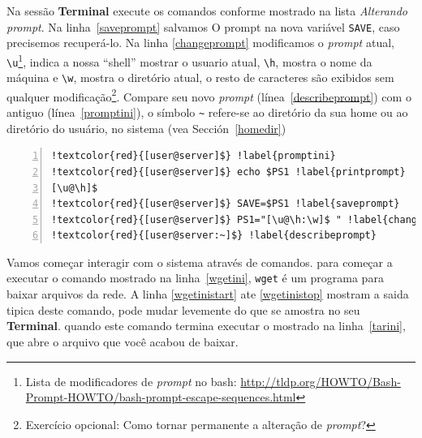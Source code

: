 \documentclass[letter,11pt]{book}
\begin{document}
Na sessão  \textbf{Terminal} execute os comandos conforme mostrado na lista \textit{Alterando prompt}. Na linha~\ref{saveprompt} salvamos O prompt na nova variável \Verb+SAVE+, caso precisemos recuperá-lo. Na linha \ref{changeprompt} modificamos o \textit{prompt} atual, \Verb+\u+\footnote{Lista de modificadores de \textit{prompt} no bash: \url{http://tldp.org/HOWTO/Bash-Prompt-HOWTO/bash-prompt-escape-sequences.html}}, indica a nossa ``shell'' mostrar o usuario atual, \Verb+\h+, mostra o nome da  máquina e \Verb+\w+, mostra o diretório atual, o resto de caracteres são exibidos sem qualquer modificação\footnote{Exercício opcional: {\textquestiondown}Como tornar permanente a alteração de \textit{prompt}?}. Compare seu novo \textit{prompt} (línea~\ref{describeprompt}) com o antiguo (línea~\ref{promptini}), o símbolo \Verb+~+ refere-se ao diretório da sua home ou ao diretório do usuário, no sistema  (vea Sección~\ref{homedir})

\begin{Verbatim}[commandchars=!\{\},numbers=left,label=Alterando o prompt,frame=topline,fontsize=\scriptsize]
!textcolor{red}{[user@server]$} !label{promptini}
!textcolor{red}{[user@server]$} echo $PS1 !label{printprompt}
[\u@\h]$
!textcolor{red}{[user@server]$} SAVE=$PS1 !label{saveprompt}
!textcolor{red}{[user@server]$} PS1="[\u@\h:\w]$ " !label{changeprompt}
!textcolor{red}{[user@server:~]$} !label{describeprompt}
\end{Verbatim} 

Vamos começar interagir com o sistema através de comandos. para começar a executar o comando mostrado na linha~\ref{wgetini}, \Verb+wget+ é um programa para baixar arquivos da rede. A linha \ref{wgetinistart} ate \ref{wgetinistop} mostram a saida tipica deste comando, pode mudar levemente do que se amostra no seu \textbf{Terminal}. quando este comando termina executar o mostrado na linha~\ref{tarini}, que abre o arquivo que você acabou de baixar.
\end{document}
